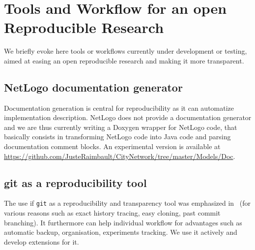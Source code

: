 



\chapter{Tools and Workflow for an open Reproducible Research} %

\label{app:workflow} %





%
%
%





\bigskip

We briefly evoke here tools or workflows currently under development or testing, aimed at easing an open reproducible research and making it more transparent.


\section{NetLogo documentation generator}

Documentation generation is central for reproducibility as it can automatize implementation description. NetLogo does not provide a documentation generator and we are thus currently writing a Doxygen wrapper for NetLogo code, that basically consists in transforming NetLogo code into Java code and parsing documentation comment blocks. An experimental version is available at \url{https://github.com/JusteRaimbault/CityNetwork/tree/master/Models/Doc}.



\section{git as a reproducibility tool}

The use if \texttt{git} as a reproducibility and transparency tool was emphasized in~\cite{ram2013git} (for various reasons such as exact history tracing, easy cloning, past commit branching). It furthermore can help individual workflow for advantages such as automatic backup, organisation, experiments tracking. We use it actively and develop extensions for it.


